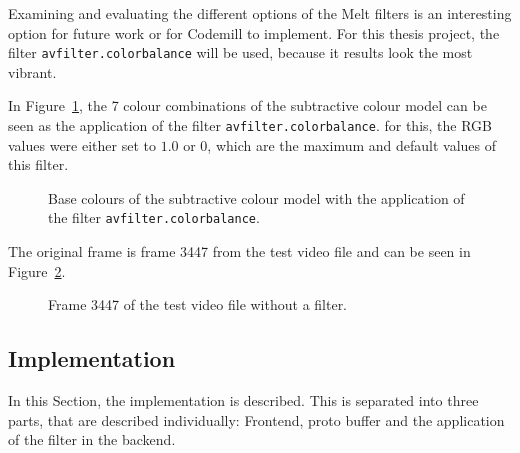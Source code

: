 \documentclass[../MasterThesis.tex]{subfiles}
\begin{document}
Examining and evaluating the different options of the Melt filters is an interesting option for future work or for Codemill to implement. For this thesis project, the filter \texttt{avfilter.colorbalance} will be used, because it results look the most vibrant.

In Figure~\ref{figure:septopus}, the 7 colour combinations of the subtractive colour model can be seen as the application of the filter \texttt{avfilter.colorbalance}. for this, the RGB values were either set to $1.0$ or $0$, which are the maximum and default values of this filter. 



\begin{figure}[H]
	\begin{center}
		\label{figure:septopus}
		\caption[Base colours with the application of the filter \texttt{avfilter.colorbalance}.]{Base colours of the subtractive colour model with the application of the filter \texttt{avfilter.colorbalance}.}
	\end{center}
\end{figure}

The original frame is frame 3447 from the test video file and can be seen in Figure~\ref{figure:septo_nofilter}.

\begin{figure}[H]
	\begin{center}
		\label{figure:septo_nofilter}
		\caption[Frame 3447 of the test video file without a filter.]{Frame 3447 of the test video file without a filter.}
	\end{center}
\end{figure}












\subsection{Implementation} \label{subsection:implementation}

In this Section, the implementation is described. This is separated into three parts, that are described individually: Frontend, proto buffer and the application of the filter in the backend.
\end{document}
